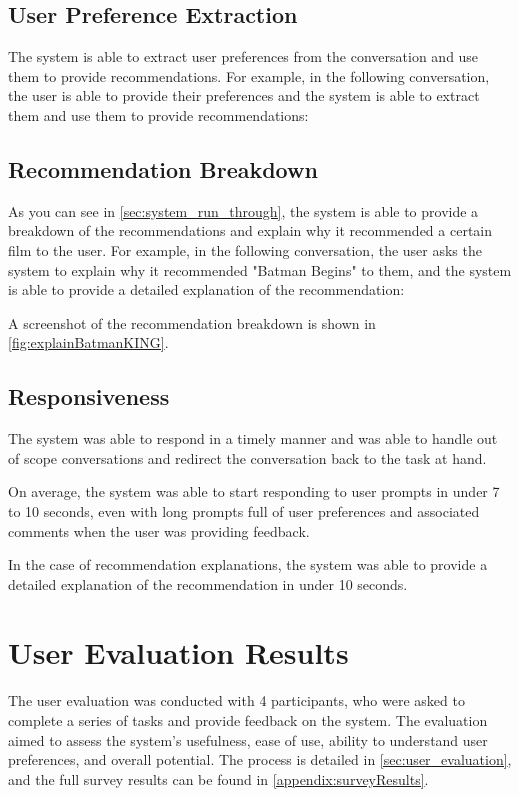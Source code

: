 \subsection{User Preference Extraction}
\label{sec:user_preference_extraction}
The system is able to extract user preferences from the conversation and use them to provide recommendations.
For example, in the following conversation, the user is able to provide their preferences and the system is able to extract them and use them to provide recommendations:



\subsection{Recommendation Breakdown}
\label{sec:recommendation_breakdown}
As you can see in \cref{sec:system_run_through}, the system is able to provide a breakdown of the recommendations and explain why it recommended a certain film to the user.
For example, in the following conversation, the user asks the system to explain why it recommended "Batman Begins" to them, and the system is able to provide a detailed explanation of the recommendation:


A screenshot of the recommendation breakdown is shown in \cref{fig:explainBatmanKING}. 

\subsection{Responsiveness}
\label{sec:responsiveness}
The system was able to respond in a timely manner and was able to handle out of scope conversations and redirect the conversation back to the task at hand.

On average, the system was able to start responding to user prompts in under 7 to 10 seconds, even with long prompts full of user preferences and associated comments when the user was providing feedback.

In the case of recommendation explanations, the system was able to provide a detailed explanation of the recommendation in under 10 seconds.



\section{User Evaluation Results}
\label{sec:user_evaluation_results}
The user evaluation was conducted with 4 participants, who were asked to complete a series of tasks and provide feedback on the system. The evaluation aimed to assess the system's usefulness, ease of use, ability to understand user preferences, and overall potential. The process is detailed in \cref{sec:user_evaluation}, and the full survey results can be found in \cref{appendix:surveyResults}.

